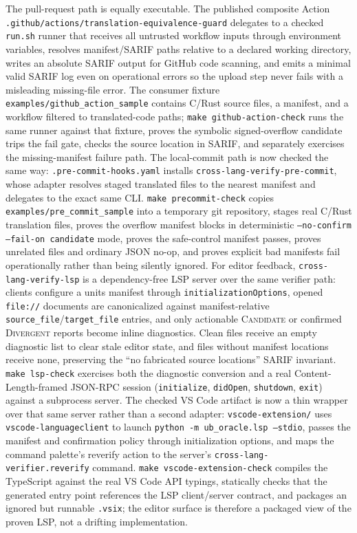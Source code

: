 \documentclass[10pt,a4paper]{article}
\begin{document}
The pull-request path is equally executable.  The published composite Action
\texttt{.github/actions/translation-equivalence-guard} delegates to a checked
\texttt{run.sh} runner that receives all untrusted workflow inputs through
environment variables, resolves manifest/SARIF paths relative to a declared
working directory, writes an absolute SARIF output for GitHub code scanning, and
emits a minimal valid SARIF log even on operational errors so the upload step
never fails with a misleading missing-file error.  The consumer fixture
\texttt{examples/github\_action\_sample} contains C/Rust source files, a manifest,
and a workflow filtered to translated-code paths; \texttt{make
github-action-check} runs the same runner against that fixture, proves the
symbolic signed-overflow candidate trips the fail gate, checks the source location
in SARIF, and separately exercises the missing-manifest failure path.
The local-commit path is now checked the same way: \texttt{.pre-commit-hooks.yaml}
installs \texttt{cross-lang-verify-pre-commit}, whose adapter resolves staged
translated files to the nearest manifest and delegates to the exact same CLI.
\texttt{make precommit-check} copies \texttt{examples/pre\_commit\_sample} into a
temporary git repository, stages real C/Rust translation files, proves the
overflow manifest blocks in deterministic \texttt{--no-confirm --fail-on
candidate} mode, proves the safe-control manifest passes, proves unrelated files
and ordinary JSON no-op, and proves explicit bad manifests fail operationally
rather than being silently ignored.
For editor feedback, \texttt{cross-lang-verify-lsp} is a dependency-free LSP
server over the same verifier path: clients configure a units manifest through
\texttt{initializationOptions}, opened \texttt{file://} documents are canonicalized
against manifest-relative \texttt{source\_file}/\texttt{target\_file} entries, and
only actionable \textsc{Candidate} or confirmed \textsc{Divergent} reports become
inline diagnostics.  Clean files receive an empty diagnostic list to clear stale
editor state, and files without manifest locations receive none, preserving the
``no fabricated source locations'' SARIF invariant.  \texttt{make lsp-check}
exercises both the diagnostic conversion and a real Content-Length-framed
JSON-RPC session (\texttt{initialize}, \texttt{didOpen}, \texttt{shutdown},
\texttt{exit}) against a subprocess server.
The checked VS Code artifact is now a thin wrapper over that same server rather
than a second adapter: \texttt{vscode-extension/} uses
\texttt{vscode-languageclient} to launch \texttt{python -m ub\_oracle.lsp
--stdio}, passes the manifest and confirmation policy through initialization
options, and maps the command palette's reverify action to the server's
\texttt{cross-lang-verifier.reverify} command.  \texttt{make
vscode-extension-check} compiles the TypeScript against the real VS Code API
typings, statically checks that the generated entry point references the LSP
client/server contract, and packages an ignored but runnable \texttt{.vsix}; the
editor surface is therefore a packaged view of the proven LSP, not a drifting
implementation.
\end{document}
